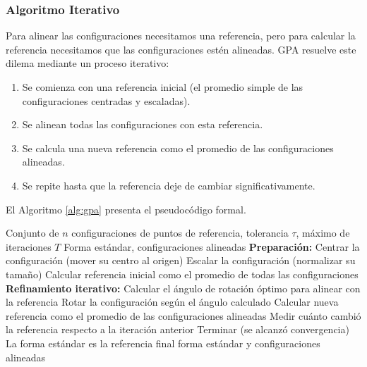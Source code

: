 \subsubsection{Algoritmo Iterativo}


Para alinear las configuraciones necesitamos una referencia, pero para calcular la referencia necesitamos que las configuraciones estén alineadas. GPA resuelve este dilema mediante un proceso iterativo:

\begin{enumerate}
    \item Se comienza con una referencia inicial (el promedio simple de las configuraciones centradas y escaladas).
    \item Se alinean todas las configuraciones con esta referencia.
    \item Se calcula una nueva referencia como el promedio de las configuraciones alineadas.
    \item Se repite hasta que la referencia deje de cambiar significativamente.
\end{enumerate}

El Algoritmo \ref{alg:gpa} presenta el pseudocódigo formal.

\begin{algorithm}[htbp]
\caption{Análisis Procrustes Generalizado Iterativo}
\label{alg:gpa}
\begin{algorithmic}[1]
\Require Conjunto de $n$ configuraciones de puntos de referencia, tolerancia $\tau$, máximo de iteraciones $T$
\Ensure Forma estándar, configuraciones alineadas
\State \textbf{Preparación:}
    \State Centrar la configuración (mover su centro al origen)
    \State Escalar la configuración (normalizar su tamaño)
\EndFor
\State Calcular referencia inicial como el promedio de todas las configuraciones
\State \textbf{Refinamiento iterativo:}
        \State Calcular el ángulo de rotación óptimo para alinear con la referencia
        \State Rotar la configuración según el ángulo calculado
    \EndFor
    \State Calcular nueva referencia como el promedio de las configuraciones alineadas
    \State Medir cuánto cambió la referencia respecto a la iteración anterior
        \State Terminar (se alcanzó convergencia)
    \EndIf
\EndFor
\State La forma estándar es la referencia final
\State \Return forma estándar y configuraciones alineadas
\end{algorithmic}
\end{algorithm}

